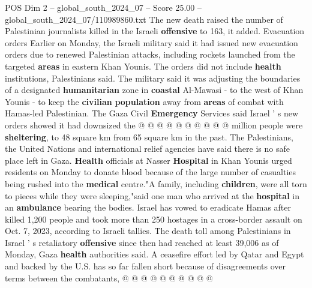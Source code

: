 \begin{textsample}{POS Dim 2 – global\_south\_2024\_07 – Score 25.00 – global\_south\_2024\_07/110989860.txt}
The new death raised the number of Palestinian journalists killed in the Israeli \textbf{offensive} to 163, it added.
Evacuation orders Earlier on Monday, the Israeli military said it had issued new evacuation orders due to renewed Palestinian attacks, including rockets launched from the targeted \textbf{areas} in eastern Khan Younis.
The orders did not include \textbf{health} institutions, Palestinians said.
The military said it was adjusting the boundaries of a designated \textbf{humanitarian} zone in \textbf{coastal} Al-Mawasi - to the west of Khan Younis - to keep the \textbf{civilian} \textbf{population} away from \textbf{areas} of combat with Hamas-led Palestinian.
The Gaza Civil \textbf{Emergency} Services said Israel ' s new orders showed it had downsized the @ @ @ @ @ @ @ @ @ @ million people were \textbf{sheltering}, to 48 square km from 65 square km in the past.
The Palestinians, the United Nations and international relief agencies have said there is no safe place left in Gaza. \textbf{Health} officials at Nasser \textbf{Hospital} in Khan Younis urged residents on Monday to donate blood because of the large number of casualties being rushed into the \textbf{medical} centre."A family, including \textbf{children}, were all torn to pieces while they were sleeping,"said one man who arrived at the \textbf{hospital} in an \textbf{ambulance} bearing the bodies.
Israel has vowed to eradicate Hamas after killed 1,200 people and took more than 250 hostages in a cross-border assault on Oct. 7, 2023, according to Israeli tallies.
The death toll among Palestinians in Israel ' s retaliatory \textbf{offensive} since then had reached at least 39,006 as of Monday, Gaza \textbf{health} authorities said.
A ceasefire effort led by Qatar and Egypt and backed by the U.S. has so far fallen short because of disagreements over terms between the combatants, @ @ @ @ @ @ @ @ @ @

\end{textsample}
